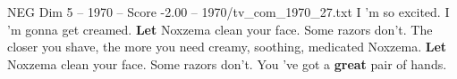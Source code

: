 \begin{textsample}{NEG Dim 5 – 1970 – Score -2.00 – 1970/tv\_com\_1970\_27.txt}  \label{ex:f5_neg_056}
I 'm so excited.
I 'm gonna get creamed. \textbf{Let} Noxzema clean your face.
Some razors don't.
The closer you shave, the more you need creamy, soothing, medicated Noxzema. \textbf{Let} Noxzema clean your face.
Some razors don't.
You 've got a \textbf{great} pair of hands.

\end{textsample}
